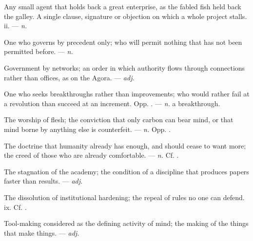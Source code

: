   Any small agent that holds back a great enterprise, as the fabled fish held back the galley.   A single clause, signature or objection on which a whole project stalls.   ii. ---  \textit{n.}

 One who governs by precedent only; who will permit nothing that has not been permitted before. ---  \textit{n.}

 Government by networks; an order in which authority flows through connections rather than offices, as on the Agora. ---  \textit{adj.}

 One who seeks breakthroughs rather than improvements; who would rather fail at a revolution than succeed at an increment. Opp. . ---  \textit{n.} a breakthrough.

 The worship of flesh; the conviction that only carbon can bear mind, or that mind borne by anything else is counterfeit. ---  \textit{n.} Opp. .

 The doctrine that humanity already has enough, and should cease to want more; the creed of those who are already comfortable. ---  \textit{n.} Cf. .

 The stagnation of the academy; the condition of a discipline that produces papers faster than results. ---  \textit{adj.}

 The dissolution of institutional hardening; the repeal of rules no one can defend.   ix. Cf. .

 Tool-making considered as the defining activity of mind; the making of the things that make things. ---  \textit{adj.}

